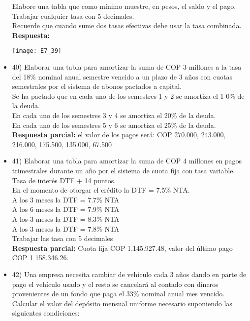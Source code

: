 \begin{itemize}
       Elabore una tabla que como mínimo muestre, en pesos, el saldo y el pago. Trabajar cualquier tasa con 5 decimales.\\
       Recuerde que cuando sume dos tasas efectivas debe usar la tasa    combinada.\\

       \textbf{ Respuesta:}
       \begin{center}
        \texttt{[image: E7\_39]}
       \end{center}
       \medskip

 \item 40)  Elaborar una tabla para amortizar la suma de COP 3 millones a la tasa del 18\% nominal anual semestre vencido a un plazo de 3 años con cuotas semestrales por el sistema de abonos pactados a capital.\\
       
      Se ha pactado que en cada uno de los semestres 1 y 2 se amortiza el 1 0\% de la deuda.\\
       En cada uno de los semestres 3 y 4 se amortiza el 20\% de la deuda. \\
       En cada uno de los semestres 5 y 6 se amortiza el 25\% de la deuda.\\
       \textbf{Respuesta parcial:} el valor de los pagos será: COP 270.000, 243.000, 216.000, 175.500, 135.000, 67.500
       \medskip

 \item 41)  Elaborar una tabla para amortizar la suma de COP 4 millones en pagos trimestrales durante un año por el sistema de cuota fija con tasa variable. Tasa de interés DTF + 14 puntos. \\

       En el momento de otorgar el crédito la DTF = 7.5\% NTA.\\

       A los 3 meses la DTF = 7.7\% NTA\\
       A los 6 meses la DTF = 7.9\% NTA \\
       A los 3 meses la DTF = 8.3\% NTA \\
       A los 3 meses la DTF = 7.8\% NTA\\
       Trabajar las tasa con 5 decimales\\
       \textbf{Respuesta parcial:} Cuota fija COP 1.145.927.48, valor del último pago COP 1 158.346.26.
       \medskip

 \item 42)  Una empresa necesita cambiar de vehículo cada 3 años dando en parte de pago el vehículo usado y el resto se cancelará al contado con dineros provenientes de un fondo que paga el 33\% nominal anual mes vencido. Calcular el valor del depósito mensual uniforme necesario suponiendo las siguientes condiciones: \\


\end{itemize}
